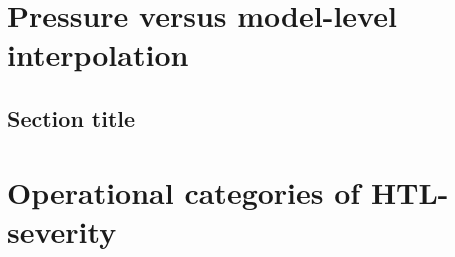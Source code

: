 \appendix
\chapter{Pressure versus model-level interpolation}

\section{Section title}
\cleardoublepage


\chapter{Operational categories of HTL-severity}

\cleardoublepage
